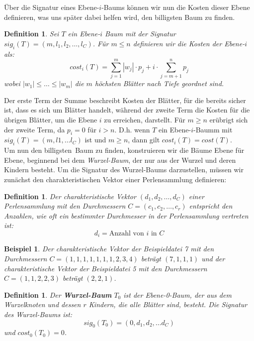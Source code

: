 \documentclass[a4paper,10pt,ngerman]{scrartcl}
\newtheorem{definition}[satz]{Definition}
\newtheorem{beispiel}[satz]{Beispiel}
\begin{document}
    Über die Signatur eines Ebene-$i$-Baums können wir nun die Kosten dieser Ebene definieren, was uns später dabei helfen wird, den \glqq billigsten\grqq{} Baum zu finden.
    \begin{definition}
        Sei $T$ ein Ebene-$i$ Baum mit der Signatur $sig_i(T) = (m, l_1, l_2, \dots, l_C)$. Für $m \le n$ definieren wir die Kosten der Ebene-$i$ als:
        \[cost_i(T) = \sum^m_{j=1} |w_j| \cdot p_j + i \cdot \sum^n_{j=m + 1}p_j\]
        wobei $|w_1| \le \dots \le |w_m|$ die $m$ höchsten Blätter nach Tiefe geordnet sind.
    \end{definition}
    Der erste Term der Summe beschreibt Kosten der Blätter, für die bereits sicher ist, dass es sich um Blätter handelt, während der zweite Term die Kosten für die übrigen Blätter, um die Ebene $i$ zu erreichen, darstellt.
    Für $m \ge n$ erübrigt sich der zweite Term, da $p_i = 0$ für $i > n$. D.h. wenn $T$ ein Ebene-$i$-Baumm mit $sig_i(T) = (m, l1, \dots l_C)$ ist und $m \ge n$, dann gilt $cost_i(T) = cost(T)$. \\
    Um nun den \glqq billigsten\grqq~Baum zu finden, konstruieren wir die Bäume Ebene für Ebene, beginnend bei dem \textit{Wurzel-Baum}, der nur aus der Wurzel und deren Kindern besteht.
    Um die Signatur des Wurzel-Baums darzustellen, müssen wir zunächst den charakteristischen Vektor einer Perlensammlung definieren:
    \begin{definition}
        Der charakteristische Vektor $(d_1, d_2, \dots, d_C)$ einer Perlensammlung mit den Durchmessern $C = (c_1, c_2, \dots, c_r)$ entspricht den Anzahlen, wie oft ein bestimmter Durchmesser in der Perlensammlung vertreten ist:
        \[d_i = \text{Anzahl von $i$ in $C$}\]
    \end{definition}
    \begin{beispiel}
        Der charakteristische Vektor der Beispieldatei 7 mit den Durchmessern $C = (1, 1, 1, 1, 1, 1, 1, 2, 3, 4)$ beträgt $(7, 1, 1, 1)$ und der charakteristische Vektor der Beispieldatei 5 mit den Durchmessern $C = (1, 1, 2, 2, 3)$ beträgt $(2, 2, 1)$.
    \end{beispiel}
    \begin{definition}
        Der \textbf{Wurzel-Baum} $T_0$ ist der Ebene-0-Baum, der aus dem Wurzelknoten und dessen $r$ Kindern, die alle Blätter sind, besteht.
        Die Signatur des Wurzel-Baums ist: \[sig_0(T_0) = (0, d_1, d_2, \dots d_C)\] und $cost_0(T_0) = 0$.
    \end{definition}
\end{document}
